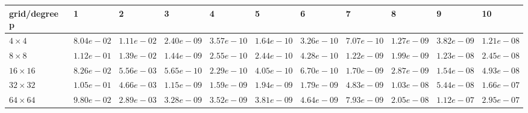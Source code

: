 \begin{tabular}{lllllllllll}
\hline
 grid/degree p   & 1          & 2          & 3          & 4          & 5          & 6          & 7          & 8          & 9          & 10         \\
\hline
 $4 \times 4$    & $8.04e-02$ & $1.11e-02$ & $2.40e-09$ & $3.57e-10$ & $1.64e-10$ & $3.26e-10$ & $7.07e-10$ & $1.27e-09$ & $3.82e-09$ & $1.21e-08$ \\
 $8 \times 8$    & $1.12e-01$ & $1.39e-02$ & $1.44e-09$ & $2.55e-10$ & $2.44e-10$ & $4.28e-10$ & $1.22e-09$ & $1.99e-09$ & $1.23e-08$ & $2.45e-08$ \\
 $16 \times 16$  & $8.26e-02$ & $5.56e-03$ & $5.65e-10$ & $2.29e-10$ & $4.05e-10$ & $6.70e-10$ & $1.70e-09$ & $2.87e-09$ & $1.54e-08$ & $4.93e-08$ \\
 $32 \times 32$  & $1.05e-01$ & $4.66e-03$ & $1.15e-09$ & $1.59e-09$ & $1.94e-09$ & $1.79e-09$ & $4.83e-09$ & $1.03e-08$ & $5.44e-08$ & $1.66e-07$ \\
 $64 \times 64$  & $9.80e-02$ & $2.89e-03$ & $3.28e-09$ & $3.52e-09$ & $3.81e-09$ & $4.64e-09$ & $7.93e-09$ & $2.05e-08$ & $1.12e-07$ & $2.95e-07$ \\
\hline
\end{tabular}
